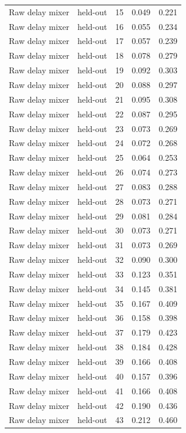 \begin{tabular}{llrrr}
Raw delay mixer & held-out & 15 & 0.049 & 0.221 \\
Raw delay mixer & held-out & 16 & 0.055 & 0.234 \\
Raw delay mixer & held-out & 17 & 0.057 & 0.239 \\
Raw delay mixer & held-out & 18 & 0.078 & 0.279 \\
Raw delay mixer & held-out & 19 & 0.092 & 0.303 \\
Raw delay mixer & held-out & 20 & 0.088 & 0.297 \\
Raw delay mixer & held-out & 21 & 0.095 & 0.308 \\
Raw delay mixer & held-out & 22 & 0.087 & 0.295 \\
Raw delay mixer & held-out & 23 & 0.073 & 0.269 \\
Raw delay mixer & held-out & 24 & 0.072 & 0.268 \\
Raw delay mixer & held-out & 25 & 0.064 & 0.253 \\
Raw delay mixer & held-out & 26 & 0.074 & 0.273 \\
Raw delay mixer & held-out & 27 & 0.083 & 0.288 \\
Raw delay mixer & held-out & 28 & 0.073 & 0.271 \\
Raw delay mixer & held-out & 29 & 0.081 & 0.284 \\
Raw delay mixer & held-out & 30 & 0.073 & 0.271 \\
Raw delay mixer & held-out & 31 & 0.073 & 0.269 \\
Raw delay mixer & held-out & 32 & 0.090 & 0.300 \\
Raw delay mixer & held-out & 33 & 0.123 & 0.351 \\
Raw delay mixer & held-out & 34 & 0.145 & 0.381 \\
Raw delay mixer & held-out & 35 & 0.167 & 0.409 \\
Raw delay mixer & held-out & 36 & 0.158 & 0.398 \\
Raw delay mixer & held-out & 37 & 0.179 & 0.423 \\
Raw delay mixer & held-out & 38 & 0.184 & 0.428 \\
Raw delay mixer & held-out & 39 & 0.166 & 0.408 \\
Raw delay mixer & held-out & 40 & 0.157 & 0.396 \\
Raw delay mixer & held-out & 41 & 0.166 & 0.408 \\
Raw delay mixer & held-out & 42 & 0.190 & 0.436 \\
Raw delay mixer & held-out & 43 & 0.212 & 0.460 \\

\end{tabular}
